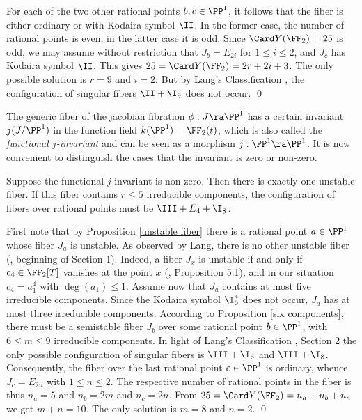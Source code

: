 For each of the  two other rational points $b,c\in \PP^1$, it follows that the fiber
is either ordinary or with Kodaira symbol $\II$.
In the former case, the number of rational points is even, in the latter case it is odd.
Since $\Card Y(\FF_2)=25$ is odd, we may assume without restriction that $J_b=E_{2i}$
for $1\leq i\leq 2$, and  $J_c$ has Kodaira symbol $\II$.
This gives $25=\Card Y(\FF_2) = 2r +  2i+3$. The only possible solution is $r=9$ and $i=2$.
But by Lang's Classification \cite{Lang-2000}, the configuration of singular fibers $\II+\I_9$ does not occur.
\qed


The generic fiber   of the jacobian fibration $\phi:J\ra\PP^1$
has a certain invariant $j(J/\PP^1)$ in the function field $ k(\PP^1)=\FF_2(t)$, which is also called
the \emph{functional $j$-invariant} and  can   be seen  as a morphism $j:\PP^1\ra\PP^1$.
It is now convenient to distinguish the cases that the invariant   is zero or non-zero.

\begin{proposition}
\notready
\label{non-constant j-invariant}
Suppose the functional $j$-invariant   is non-zero.
Then there is  exactly one  unstable fiber.
If this fiber contains $r\leq 5$ irreducible components, the configuration of fibers over   rational points
must be $\III+E_4+ \I_8$.
\end{proposition}

\proof
First note that by Proposition \ref{unstable fiber} there is a rational point $a\in\PP^1$ whose fiber $J_a$ is unstable.
As observed by Lang, there is no other unstable fiber (\cite{Lang-2000}, beginning of Section 1).
Indeed,  a fiber $J_x$ is unstable if and only if $c_4\in \FF_2[T]$ vanishes at the point $x$ (\cite{Deligne-1975}, Proposition 5.1), and
in our situation  $c_4=a_1^4$ with $\deg(a_1)\leq 1$.
Assume now that $J_a$   contains at most five irreducible components. Since the Kodaira symbol $\I_0^*$ does not occur,
$J_a$ has at most three irreducible components.
According to Proposition \ref{six components}, there must be a semistable fiber $J_b$ over some rational point $b\in\PP^1$,
with $6\leq m\leq 9$ irreducible components.
In light of Lang's Classification \cite{Lang-2000}, Section 2 the only possible configuration of singular fibers
is $\III+\I_6$ and $\III+\I_8$. Consequently, the fiber over the last rational point $c\in\PP^1$ is ordinary,
whence $J_c=E_{2n}$ with $1\leq n\leq 2$.
The respective number of rational points in the fiber is thus
$n_a=5$ and $n_b=2m$ and $n_c=2n$. From $25=\Card Y(\FF_2)=n_a+n_b+n_c$ we get $m+n=10$.
The only solution is  $m=8$ and $n=2$.
\qed


